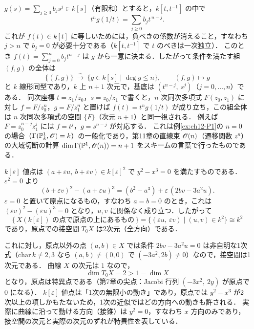 \begin{center}
\end{center}

$g(s)=\sum_{j\ge0}b_js^j\in k[s]$（有限和）とすると，$k[t,t^{-1}]$ の中で
\[
  t^ng(1/t)=\sum_{j\ge0}b_jt^{\,n-j}.
\]
これが $f(t)\in k[t]$ に等しいためには，負べきの係数が消えること，すなわち $j>n$ で $b_j=0$ が必要十分である（$k[t,t^{-1}]$ で $t$ のべきは一次独立）．
このとき $f(t)=\sum_{j=0}^nb_jt^{n-j}$ は $g$ から一意に決まる．したがって条件を満たす組 $(f,g)$ の全体は
\[
  \{(f,g)\}\ \xrightarrow{\ \sim\ }\ \{g\in k[s]\mid\deg g\le n\},\qquad (f,g)\mapsto g
\]
と $k$ 線形同型であり，$k$ 上 $n+1$ 次元で，基底は $(t^{n-j},\ s^j)$（$j=0,\dots,n$）である．
同次座標 $t=z_1/z_0$，$s=z_0/z_1$ で書くと，$n$ 次同次多項式 $F(z_0,z_1)$ に対し $f=F/z_0^n$，$g=F/z_1^n$ と置けば $f(t)=t^ng(1/t)$ が成り立ち，この組全体は $n$ 次同次多項式の空間 $\{F\}$（次元 $n+1$）と同一視される．
例えば $F=z_0^{n-j}z_1^j$ には $f=t^j$，$g=s^{n-j}$ が対応する．
これは例\ref{ex:ch12-P1}の $n=0$ の場合（$\Gamma(\mathbb{P}^1_k,\mathscr{O})=k$）の一般化であり，第11章の直線束 $\mathscr{O}(n)$（遷移関数 $z^n$）の大域切断の計算 $\dim\Gamma(\mathbb{P}^1,\mathscr{O}(n))=n+1$ をスキームの言葉で行ったものである．

$k[\varepsilon]$ 値点は $(a+\varepsilon u,\ b+\varepsilon v)\in k[\varepsilon]^2$ で $y^2-x^3=0$ を満たすものである．$\varepsilon^2=0$ より
\[
  (b+\varepsilon v)^2-(a+\varepsilon u)^3=(b^2-a^3)+\varepsilon\,(2bv-3a^2u).
\]
$\varepsilon=0$ と置いて原点になるもの，すなわち $a=b=0$ のとき，これは $(\varepsilon v)^2-(\varepsilon u)^3=0$ となり，$u,v$ に関係なく成り立つ．したがって
\[
  \{\,X(k[\varepsilon])\text{ の点で原点の上にあるもの}\,\}=\{(\varepsilon u,\ \varepsilon v)\mid (u,v)\in k^2\}\cong k^2
\]
であり，原点での接空間 $T_0X$ は2次元（全方向）である．

これに対し，原点以外の点 $(a,b)\in X$ では条件 $2bv-3a^2u=0$ は非自明な1次式（$\mathrm{char}\,k\neq2,3$ なら $(a,b)\neq(0,0)$ で $(-3a^2,2b)\neq0$）なので，接空間は1次元である．
曲線 $X$ の次元は $1$ なので，
\[
  \dim T_0X=2>1=\dim X
\]
となり，原点は特異点である（第7章の尖点：Jacobi 行列 $(-3x^2,\ 2y)$ が原点で $0$ になる）．
$k[\varepsilon]$ 値点は「1次の無限小の動き」であり，原点では $y^2-x^3$ が2次以上の項しかもたないため，1次の近似ではどの方向への動きも許される．
実際に曲線に沿って動ける方向（接錐）は $y^2=0$，すなわち $x$ 方向のみであり，接空間の次元と実際の次元のずれが特異性を表している．

